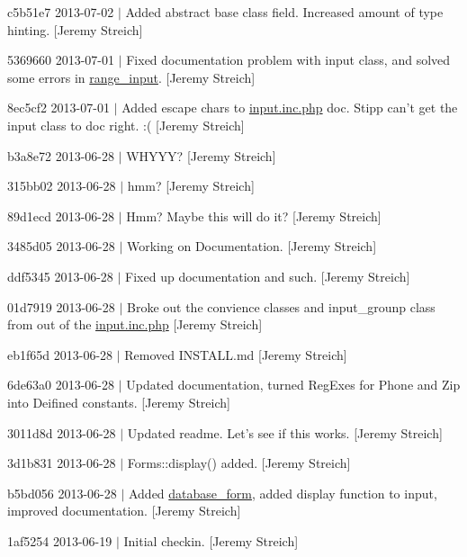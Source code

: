 \begin{DoxyItemize}
\item c5b51e7 2013-\/07-\/02 $|$ Added abstract base class field. Increased amount of type hinting. \mbox{[}Jeremy Streich\mbox{]}
\item 5369660 2013-\/07-\/01 $|$ Fixed documentation problem with input class, and solved some errors in \hyperlink{classrange__input}{range\-\_\-input}. \mbox{[}Jeremy Streich\mbox{]}
\item 8ec5cf2 2013-\/07-\/01 $|$ Added escape chars to \hyperlink{input_8inc_8php}{input.\-inc.\-php} doc. Stipp can't get the input class to doc right. \-:( \mbox{[}Jeremy Streich\mbox{]}
\item b3a8e72 2013-\/06-\/28 $|$ W\-H\-Y\-Y\-Y? \mbox{[}Jeremy Streich\mbox{]}
\item 315bb02 2013-\/06-\/28 $|$ hmm? \mbox{[}Jeremy Streich\mbox{]}
\item 89d1ecd 2013-\/06-\/28 $|$ Hmm? Maybe this will do it? \mbox{[}Jeremy Streich\mbox{]}
\item 3485d05 2013-\/06-\/28 $|$ Working on Documentation. \mbox{[}Jeremy Streich\mbox{]}
\item ddf5345 2013-\/06-\/28 $|$ Fixed up documentation and such. \mbox{[}Jeremy Streich\mbox{]}
\item 01d7919 2013-\/06-\/28 $|$ Broke out the convience classes and input\-\_\-grounp class from out of the \hyperlink{input_8inc_8php}{input.\-inc.\-php} \mbox{[}Jeremy Streich\mbox{]}
\item eb1f65d 2013-\/06-\/28 $|$ Removed I\-N\-S\-T\-A\-L\-L.\-md \mbox{[}Jeremy Streich\mbox{]}
\item 6de63a0 2013-\/06-\/28 $|$ Updated documentation, turned Reg\-Exes for Phone and Zip into Deifined constants. \mbox{[}Jeremy Streich\mbox{]}
\item 3011d8d 2013-\/06-\/28 $|$ Updated readme. Let's see if this works. \mbox{[}Jeremy Streich\mbox{]}
\item 3d1b831 2013-\/06-\/28 $|$ Forms\-::display() added. \mbox{[}Jeremy Streich\mbox{]}
\item b5bd056 2013-\/06-\/28 $|$ Added \hyperlink{classdatabase__form}{database\-\_\-form}, added display function to input, improved documentation. \mbox{[}Jeremy Streich\mbox{]}
\item 1af5254 2013-\/06-\/19 $|$ Initial checkin. \mbox{[}Jeremy Streich\mbox{]} 
\end{DoxyItemize}